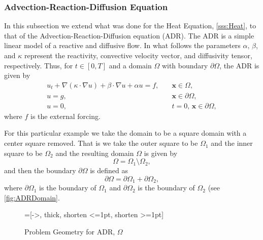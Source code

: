 \subsubsection{Advection-Reaction-Diffusion Equation} \label{sss:ADR}
    In this subsection we extend what was done for the Heat Equation,
    \autoref{sss:Heat}, to that of the Advection-Reaction-Diffusion equation
    (ADR). The ADR is a simple linear model of a reactive and diffusive flow. In
    what follows the parameters $\alpha,\,\beta$, and $\kappa$ represent the
    reactivity, convective velocity vector, and diffusivity tensor,
    respectively. Thus, for $t\in [0,T]$ and a domain $\Omega$ with boundary
    $\partial \Omega$, the ADR is given by
    \begin{equation}
        \begin{split}
            u_t + \nabla \left(\kappa\cdot \nabla u \right) + \beta \cdot \nabla
                u + \alpha u = f,& \quad \mathbf{x} \in \Omega, \\
            u = g,& \quad \mathbf{x} \in \partial \Omega, \\
            u = 0,& \quad t = 0,\, \mathbf{x} \in \partial \Omega,
        \end{split}
        \label{eq:ADR}
    \end{equation}
    where $f$ is the external forcing.

    For this particular example we take the domain to be a square domain with a
    center square removed. That is we take the outer square to be $\Omega_1$ and
    the inner square to be $\Omega_2$ and the resulting domain $\Omega$ is given
    by
    \begin{equation}
        \Omega = \Omega_1\setminus \Omega_2,
        \label{eq:ADRDomain}
    \end{equation}
    and then the boundary $\partial \Omega$ is defined as
    \begin{equation}
        \partial \Omega = \partial \Omega_1 + \partial \Omega_2,
        \label{eq:ADRBoundary}
    \end{equation}
    where $\partial \Omega_1$ is the boundary of $\Omega_1$ and $\partial
    \Omega_2$ is the boundary of $\Omega_2$ (see \autoref{fig:ADRDomain}.

    \begin{figure}[h]
        \centering
        =[->, thick, shorten <=1pt, shorten >=1pt]
        \caption{Problem Geometry for ADR, $\Omega$}
        \label{fig:ADRDomain}
    \end{figure}


